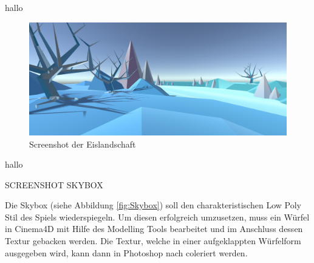 hallo


\begin{figure}[!htbp]
	\centering
		\includegraphics[width=1.0\textwidth]{images/Eis}
	\caption{Screenshot der Eislandschaft}
	\label{fig:Eis}
\end{figure}

hallo



SCREENSHOT SKYBOX

Die Skybox (siehe Abbildung \ref{fig:Skybox}) soll den charakteristischen Low Poly Stil des Spiels wiederspiegeln. Um diesen erfolgreich umzusetzen, muss ein Würfel in Cinema4D mit Hilfe des Modelling Tools bearbeitet und im Anschluss dessen Textur gebacken werden. Die Textur, welche in einer aufgeklappten Würfelform ausgegeben wird, kann dann in Photoshop nach coleriert werden.